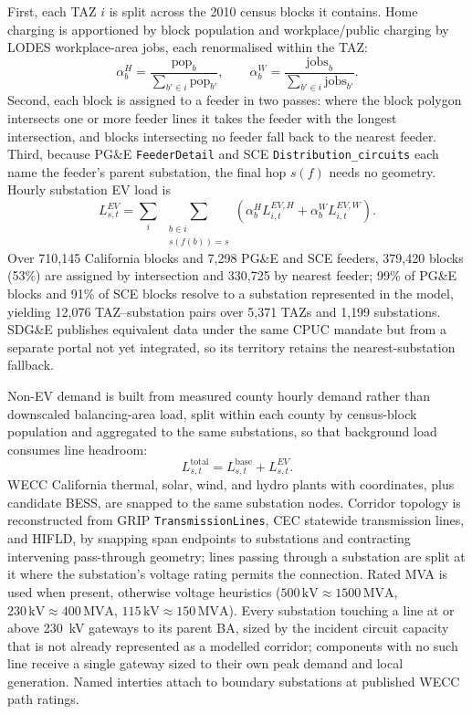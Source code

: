 \documentclass[11pt]{article}
\begin{document}
First, each TAZ \(i\) is split across the 2010 census blocks it contains. Home charging is apportioned by block population and workplace/public charging by LODES workplace-area jobs, each renormalised within the TAZ:
\[
\alpha^{H}_{b}=\frac{\mathrm{pop}_b}{\sum_{b'\in i}\mathrm{pop}_{b'}},
\qquad
\alpha^{W}_{b}=\frac{\mathrm{jobs}_b}{\sum_{b'\in i}\mathrm{jobs}_{b'}}.
\]
Second, each block is assigned to a feeder in two passes: where the block polygon intersects one or more feeder lines it takes the feeder with the longest intersection, and blocks intersecting no feeder fall back to the nearest feeder. Third, because PG\&E \texttt{FeederDetail} and SCE \texttt{Distribution\_circuits} each name the feeder's parent substation, the final hop \(s(f)\) needs no geometry. Hourly substation EV load is
\[
L^{EV}_{s,t}=\sum_{i}\;\sum_{\substack{b\in i\\ s(f(b))=s}}
\left(\alpha^{H}_{b}L^{EV,H}_{i,t}+\alpha^{W}_{b}L^{EV,W}_{i,t}\right).
\]
Over 710{,}145 California blocks and 7{,}298 PG\&E and SCE feeders, 379{,}420 blocks (53\%) are assigned by intersection and 330{,}725 by nearest feeder; 99\% of PG\&E blocks and 91\% of SCE blocks resolve to a substation represented in the model, yielding 12{,}076 TAZ--substation pairs over 5{,}371 TAZs and 1{,}199 substations. SDG\&E publishes equivalent data under the same CPUC mandate but from a separate portal not yet integrated, so its territory retains the nearest-substation fallback.

Non-EV demand is built from measured county hourly demand rather than downscaled balancing-area load, split within each county by census-block population and aggregated to the same substations, so that background load consumes line headroom:
\[
L^{\text{total}}_{s,t}=L^{\text{base}}_{s,t}+L^{EV}_{s,t}.
\]
WECC California thermal, solar, wind, and hydro plants with coordinates, plus candidate BESS, are snapped to the same substation nodes. Corridor topology is reconstructed from GRIP \texttt{TransmissionLines}, CEC statewide transmission lines, and HIFLD, by snapping span endpoints to substations and contracting intervening pass-through geometry; lines passing through a substation are split at it where the substation's voltage rating permits the connection. Rated MVA is used when present, otherwise voltage heuristics (\(500\,\mathrm{kV}\approx 1500\,\mathrm{MVA}\), \(230\,\mathrm{kV}\approx 400\,\mathrm{MVA}\), \(115\,\mathrm{kV}\approx 150\,\mathrm{MVA}\)). Every substation touching a line at or above 230~kV gateways to its parent BA, sized by the incident circuit capacity that is not already represented as a modelled corridor; components with no such line receive a single gateway sized to their own peak demand and local generation. Named interties attach to boundary substations at published WECC path ratings.
\end{document}

